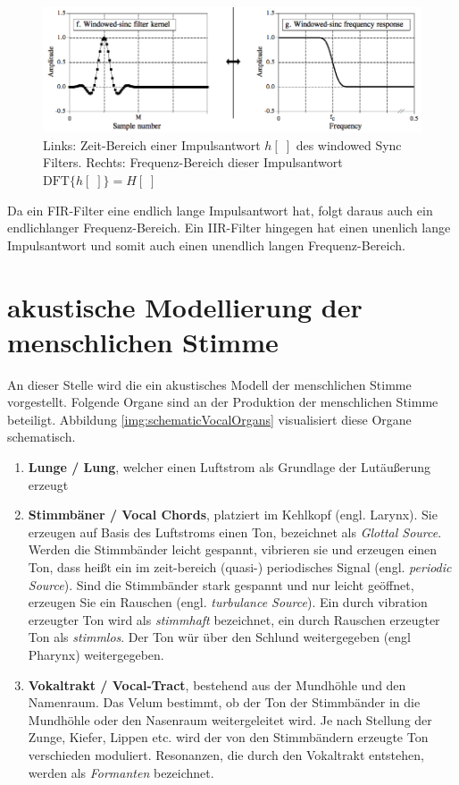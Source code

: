 \begin{figure}[h]
	\centering
	\includegraphics[width=1\textwidth]{bilder/lowPassFilter.png}
	\caption{Links: Zeit-Bereich einer Impulsantwort $h[\;]$ des \glqq windowed Sync Filters\grqq. Rechts: Frequenz-Bereich dieser Impulsantwort $\text{DFT}\{h[\;]\} = H[\;]$ \cite[S. 287]{dspGuide}}
	\label{img:convolutionExample}
\end{figure}

Da ein FIR-Filter eine endlich lange Impulsantwort hat, folgt daraus auch ein endlichlanger Frequenz-Bereich. Ein IIR-Filter hingegen hat einen unenlich lange Impulsantwort und somit auch einen unendlich langen Frequenz-Bereich.

\section{akustische Modellierung der menschlichen Stimme}
\label{sec:theVoice}

An dieser Stelle wird die ein akustisches Modell der menschlichen Stimme vorgestellt. Folgende Organe sind an der Produktion der menschlichen Stimme beteiligt. Abbildung \ref{img:schematicVocalOrgans} visualisiert diese Organe schematisch.

\begin{enumerate}
	\item \textbf{Lunge / Lung}, welcher einen Luftstrom als Grundlage der Lutäußerung erzeugt
	\item \textbf{Stimmbäner / Vocal Chords}, platziert im Kehlkopf (engl. Larynx). Sie erzeugen auf Basis des Luftstroms einen Ton, bezeichnet als \emph{Glottal Source}. Werden die Stimmbänder leicht gespannt, vibrieren sie und erzeugen einen Ton, dass heißt ein im zeit-bereich (quasi-) periodisches Signal (engl. \emph{periodic Source}). Sind die Stimmbänder stark gespannt und nur leicht geöffnet, erzeugen Sie ein Rauschen (engl. \emph{turbulance Source}). Ein durch vibration erzeugter Ton wird als \emph{stimmhaft} bezeichnet, ein durch Rauschen erzeugter Ton als \emph{stimmlos}. Der Ton wür über den Schlund weitergegeben (engl Pharynx) weitergegeben. 
	\item  \textbf{Vokaltrakt / Vocal-Tract}, bestehend aus der Mundhöhle und den Namenraum. Das Velum bestimmt, ob der Ton der Stimmbänder in die Mundhöhle oder den Nasenraum weitergeleitet wird. Je nach Stellung der Zunge, Kiefer, Lippen etc. wird der von den Stimmbändern erzeugte Ton verschieden moduliert. Resonanzen, die durch den Vokaltrakt entstehen, werden als \emph{Formanten} bezeichnet. \cite[S. 62]{cryModel} \cite{speechProduction}
\end{enumerate}
	
